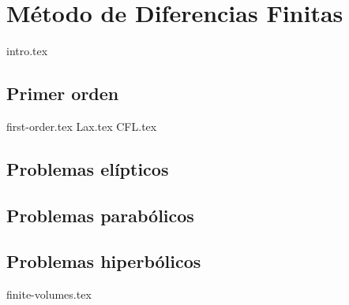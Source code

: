 \part{Método de Diferencias Finitas}

{intro.tex}

\chapter{Primer orden}

{first-order.tex}
{Lax.tex}
{CFL.tex}


\chapter{Problemas elípticos}

\chapter{Problemas parabólicos}

\chapter{Problemas hiperbólicos}

{finite-volumes.tex}